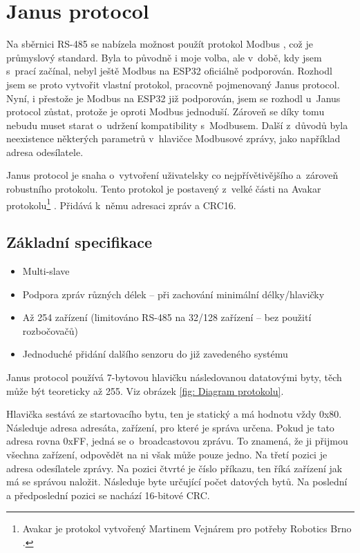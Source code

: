 \chapter{Janus protocol} \label{Protocol}
Na sběrnici RS-485 se nabízela možnost použít protokol Modbus \cite{modbus}, což je průmyslový standard.
Byla to původně i moje volba, ale v~době, kdy jsem s~prací začínal, nebyl ještě Modbus na ESP32 oficiálně podporován.
Rozhodl jsem se proto vytvořit vlastní protokol, pracovně pojmenovaný Janus protocol.
Nyní, i přestože je Modbus na ESP32 již podporován, jsem se rozhodl u~Janus protocol zůstat, protože je oproti Modbus jednoduší.
Zároveň se díky tomu nebudu muset starat o~udržení kompatibility s~Modbusem.
Další z~důvodů byla neexistence některých parametrů v~hlavičce Modbusové zprávy, jako například adresa odesílatele. 

Janus protocol je snaha o~vytvoření uživatelsky co nejpřívětivějšího a~zároveň robustního protokolu.
Tento protokol je postavený z~velké části na Avakar protokolu\footnote{Avakar je protokol vytvořený Martinem Vejnárem pro potřeby Robotics Brno \cite{robotikabrno}.} \cite{avakar}.
Přidává k~němu adresaci zpráv a CRC16.


\section{Základní specifikace}
\begin{itemize}
    \item Multi-slave
    \item Podpora zpráv různých délek -- při zachování minimální délky/hlavičky
    \item Až 254 zařízení (limitováno RS-485 na 32/128 zařízení -- bez použití rozbočovačů)
    \item Jednoduché přidání dalšího senzoru do již zavedeného systému
\end{itemize}

Janus protocol používá 7-bytovou hlavičku následovanou datatovými byty, těch může být teoreticky až 255.
Viz obrázek \ref{fig: Diagram protokolu}.

Hlavička sestává ze startovacího bytu, ten je statický a má hodnotu vždy 0x80.
Následuje adresa adresáta, zařízení, pro které je správa určena.
Pokud je tato adresa rovna 0xFF, jedná se o~broadcastovou zprávu. To znamená, že ji přijmou všechna zařízení, odpovědět na ni však může pouze jedno.
Na třetí pozici je adresa odesílatele zprávy.
Na pozici čtvrté je číslo příkazu, ten říká zařízení jak má se správou naložit.
Následuje byte určující počet datových bytů.
Na poslední a předposlední pozici se nachází 16-bitové CRC.

